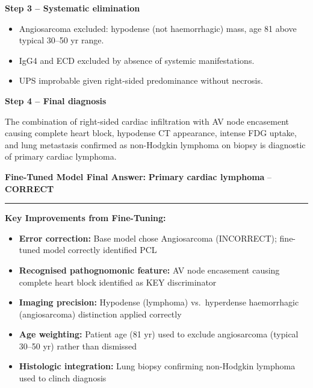 \documentclass[10pt,journal,compsoc, onecolumn]{IEEEtran}
\begin{document}
\begin{casebox}
    \vspace{0.5em}
    \noindent\textbf{Step 3 -- Systematic elimination}
    \begin{itemize}[leftmargin=*, noitemsep, topsep=2pt]
        \item Angiosarcoma excluded: \colorbox{yellow!30}{hypodense (not haemorrhagic) mass, age 81 above typical 30--50 yr range}.
        \item IgG4 and ECD excluded by absence of systemic manifestations.
        \item UPS improbable given right-sided predominance without necrosis.
    \end{itemize}

    \vspace{0.5em}
    \noindent\textbf{Step 4 -- Final diagnosis}

    The combination of \colorbox{yellow!30}{right-sided cardiac infiltration with AV node encasement causing complete heart block}, hypodense CT appearance, intense FDG uptake, and lung metastasis confirmed as non-Hodgkin lymphoma on biopsy is diagnostic of primary cardiac lymphoma.

    \vspace{1em}
    \noindent\textbf{Fine-Tuned Model Final Answer:} \colorbox{green!30}{\textbf{Primary cardiac lymphoma}} -- \textbf{CORRECT}

    \vspace{1em}
    \hrule
    \vspace{1em}

    \textbf{Key Improvements from Fine-Tuning:}
    \begin{itemize}[leftmargin=*, noitemsep, topsep=2pt]
        \item \textbf{Error correction:} Base model chose Angiosarcoma (INCORRECT); fine-tuned model correctly identified PCL
        \item \textbf{Recognised pathognomonic feature:} AV node encasement causing complete heart block identified as KEY discriminator
        \item \textbf{Imaging precision:} Hypodense (lymphoma) vs.\ hyperdense haemorrhagic (angiosarcoma) distinction applied correctly
        \item \textbf{Age weighting:} Patient age (81 yr) used to exclude angiosarcoma (typical 30--50 yr) rather than dismissed
        \item \textbf{Histologic integration:} Lung biopsy confirming non-Hodgkin lymphoma used to clinch diagnosis
    \end{itemize}
\end{casebox}
\end{document}
